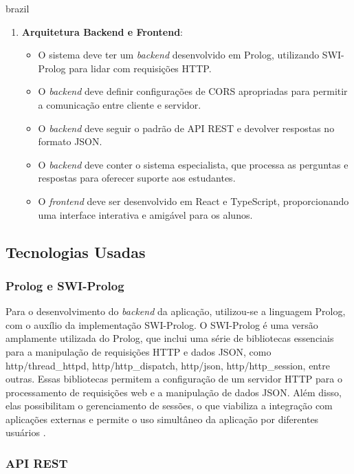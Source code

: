 \begin{otherlanguage*}{brazil}
\begin{enumerate}[label=RNF\arabic* –]
    \item \textbf{Arquitetura Backend e Frontend}:
    \begin{itemize}
        \item O sistema deve ter um \textit{backend} desenvolvido em Prolog, utilizando SWI-Prolog para lidar com requisições HTTP.
        \item O \textit{backend} deve definir configurações de CORS apropriadas para permitir a comunicação entre cliente e servidor.
        \item O \textit{backend} deve seguir o padrão de API REST e devolver respostas no formato JSON.
        \item O \textit{backend} deve conter o sistema especialista, que processa as perguntas e respostas para oferecer suporte aos estudantes.
        \item O \textit{frontend} deve ser desenvolvido em React e TypeScript, proporcionando uma interface interativa e amigável para os alunos.
    \end{itemize}
\end{enumerate}

\subsection{Tecnologias Usadas}

\subsubsection{Prolog e SWI-Prolog}

Para o desenvolvimento do \textit{backend} da aplicação, utilizou-se a linguagem Prolog, com o auxílio da implementação SWI-Prolog. O SWI-Prolog é uma versão amplamente utilizada do Prolog, que inclui uma série de bibliotecas essenciais para a manipulação de requisições HTTP e dados JSON, como http/thread\_httpd, http/http\_dispatch, http/json, http/http\_session, entre outras. Essas bibliotecas permitem a configuração de um servidor HTTP para o processamento de requisições web e a manipulação de dados JSON. Além disso, elas possibilitam o gerenciamento de sessões, o que viabiliza a integração com aplicações externas e permite o uso simultâneo da aplicação por diferentes usuários \cite{swiprologhttp}.

\subsubsection{API REST}


\end{otherlanguage*}

